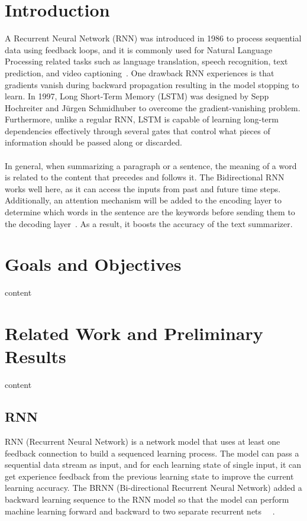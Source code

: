 \documentclass[conference]{IEEEtran}
\begin{document}
\section{Introduction}
A Recurrent Neural Network (RNN) was introduced in 1986 to process sequential data using feedback loops, and it is commonly used for Natural Language Processing related tasks such as language translation, speech recognition, text prediction, and video captioning~\cite{staudemeyer2019understanding}. One drawback RNN experiences is that gradients vanish during backward propagation resulting in the model stopping to learn. In 1997, Long Short-Term Memory (LSTM) was designed by Sepp Hochreiter and J\"{u}rgen Schmidhuber to overcome the gradient-vanishing problem. Furthermore, unlike a regular RNN, LSTM is capable of learning long-term dependencies effectively through several gates that control what pieces of information should be passed along or discarded. \\ \\
\indent In general, when summarizing a paragraph or a sentence, the meaning of a word is related to the content that precedes and follows it. The Bidirectional RNN works well here, as it can access the inputs from past and future time steps. Additionally, an attention mechanism will be added to the encoding layer to determine which words in the sentence are the keywords before sending them to the decoding layer~\cite{vaswani2017attention}. As a result, it boosts the accuracy of the text summarizer.

\section{Goals and Objectives}
content

\section{Related Work and Preliminary Results}
content 
\subsection{RNN}
RNN (Recurrent Neural Network) is a network model that uses at least one feedback connection to build a sequenced learning process. The model can pass a sequential data stream as input, and for each learning state of single input, it can get experience feedback from the previous learning state to improve the current learning accuracy. The BRNN (Bi-directional Recurrent Neural Network) added a backward learning sequence to the RNN model so that the model can perform machine learning forward and backward to two separate recurrent nets ~\cite{vu2016bi}~\cite{schuster1997bidirectional}. 
\end{document}
